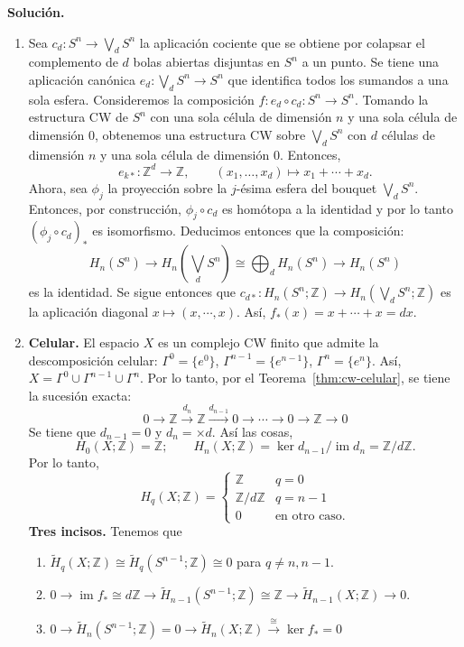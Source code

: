 \documentclass[11pt,a4paper]{article}
\theoremstyle{plain}
\theoremstyle{definition}
\theoremstyle{remark}
\newcommand{\ZZ}{\mathbb Z}
\DeclareMathOperator{\im}{im}
\begin{document}
\begin{enumerate}[label=\arabic*.,leftmargin=*]
\noindent\textbf{Solución.}
\begin{enumerate}[label=\alph*)]
\item Sea $c_d:S^n\to\bigvee_dS^n$ la aplicación cociente que se obtiene
por colapsar el complemento de $d$ bolas abiertas disjuntas en $S^n$ a un
punto. Se tiene una aplicación canónica $e_d:\bigvee_dS^n\to S^n$ que
identifica todos los sumandos a una sola esfera. Consideremos la
composición $f:e_d\circ c_d:S^n\to S^n$. Tomando la estructura CW de $S^n$
con una sola célula de dimensión $n$ y una sola célula de dimensión $0$,
obtenemos una estructura CW sobre $\bigvee_dS^n$ con $d$ células de
dimensión $n$ y una sola célula de dimensión $0$. Entonces,
\[
e_{k*}:\ZZ^d\to\ZZ, \qquad (x_1,\dots,x_d)\mapsto x_1+\cdots+x_d.
\]
Ahora, sea $\phi_j$ la proyección sobre la $j$-ésima esfera del bouquet
$\bigvee_dS^n$. Entonces, por construcción, $\phi_j\circ c_d$ es homótopa a
la identidad y por lo tanto $(\phi_j\circ c_d)_*$ es isomorfismo.
Deducimos entonces que la composición:
\[
H_n(S^n)\to H_n\left(\bigvee_dS^n\right)\cong\bigoplus_dH_n(S^n)\to H_n(S^n)
\]
es la identidad. Se sigue entonces que
$c_{d*}:H_n(S^n;\ZZ)\to H_n\left(\bigvee_dS^n;\ZZ\right)$ es la aplicación
diagonal $x\mapsto(x,\cdots,x)$. Así, $f_*(x)=x+\cdots+x=dx$.
\item \textbf{Celular.} El espacio $X$ es un complejo CW finito que admite
la descomposición celular: $\Gamma^0=\{e^0\}$, $\Gamma^{n-1}=\{e^{n-1}\}$,
$\Gamma^n=\{e^n\}$. Así, $X=\Gamma^0\cup\Gamma^{n-1}\cup\Gamma^n$. Por lo
tanto, por el Teorema~\ref{thm:cw-celular}, se tiene la sucesión exacta:
\[
0\to\ZZ\xrightarrow{d_n}\ZZ\xrightarrow{d_{n-1}}0\to\cdots\to0\to\ZZ\to0
\]
Se tiene que $d_{n-1}=0$ y $d_n=\times d$. Así las cosas,
\[
H_0(X;\ZZ)=\ZZ; \qquad H_n(X;\ZZ)=\ker d_{n-1}/\im d_n=\ZZ/d\ZZ.
\]
Por lo tanto,
\[
H_q(X;\ZZ)=\begin{cases}\ZZ & q=0\\ \ZZ/d\ZZ & q=n-1\\0 & \text{en otro caso.}\end{cases}
\]
\textbf{Tres incisos.} Tenemos que
\begin{enumerate}[label=\arabic*)]
\item $\tilde H_q(X;\ZZ)\cong\tilde H_q(S^{n-1};\ZZ)\cong0$ para
$q\ne n,n-1$.
\item $0\to\im f_*\cong d\ZZ\to\tilde H_{n-1}(S^{n-1};\ZZ)\cong\ZZ\to\tilde H_{n-1}(X;\ZZ)\to0$.
\item $0\to\tilde H_n(S^{n-1};\ZZ)=0\to\tilde H_n(X;\ZZ)\xrightarrow{\cong}\ker f_*=0$
\end{enumerate}

\end{enumerate}
\end{enumerate}
\end{document}
